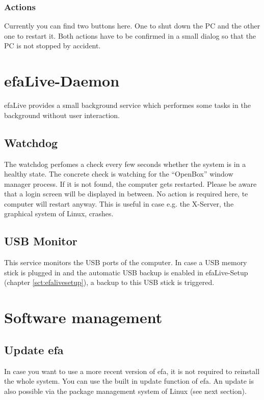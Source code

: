 \documentclass[a4paper,12pt,twoside]{article}
\begin{document}
\subsubsection{Actions}
\label{sct:actions}
Currently you can find two buttons here. One to shut down the PC and the
other one to restart it. Both actions have to be confirmed in a small
dialog so that the PC is not stopped by accident.


\section{efaLive-Daemon}
\label{sct:efalivedaemon}
efaLive provides a small background service which performes some tasks
in the background without user interaction.


\subsection{Watchdog}
\label{sct:watchdog}
The watchdog perfomes a check every few seconds whether the system is in
a healthy state. The concrete check is watching for the "`OpenBox"' window
manager process. If it is not found, the computer gets restarted. Please be
aware that a login screen will be displayed in between. No action is
required here, te computer will restart anyway.
This is useful in case e.g. the X-Server, the graphical system of Linux,
crashes.


\subsection{USB Monitor}
\label{sct:usb_monitor}
This service monitors the USB ports of the computer. In case a USB memory
stick is plugged in and the automatic USB backup is enabled in efaLive-Setup
(chapter \ref{sct:efalivesetup}), a backup to this USB stick is triggered.


\section{Software management}
\label{sct:software_management}
\subsection{Update efa}
\label{sct:update_efa}
In case you want to use a more recent version of efa, it is not required
to reinstall the whole system. You can use the built in update function
of efa. An update is also possible via the package management system of Linux
(see next section).
\end{document}
